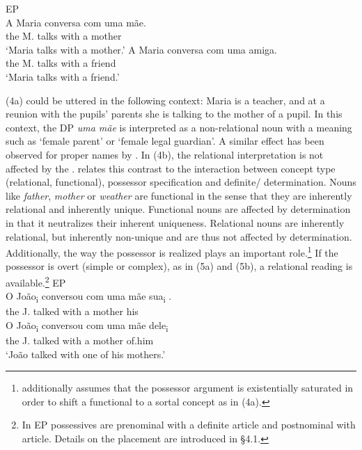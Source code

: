 \documentclass[output=paper]{langsci/langscibook}
\begin{document}
\ea%
    EP\label{ex:wein:4}\\
    \ea 
    \gll A Maria conversa com uma mãe.\\
         the M. talks with a mother\\
    \glt ‘Maria talks with a mother.’
    \ex  
    \gll A Maria conversa com uma amiga.\\
         the M. talks with a friend\\
    \glt ‘Maria talks with a friend.’
    \z
\z

(4a) could be uttered in the following context: Maria is a teacher, and at a reunion with the pupils’ parents she is talking to the mother of a pupil. In this context, the DP \textit{uma mãe} is interpreted as a non-relational noun with a meaning such as ‘female parent’ or ‘female legal guardian’. A similar effect has been observed for proper names by \citet{Longobardi1994}. In (4b), the relational interpretation is not affected by the  . \citet{Löbner2011} relates this contrast to the interaction between concept type (relational, functional), possessor specification and definite\slash {} determination. Nouns like \textit{father}, \textit{mother} or \textit{weather} are functional in the sense that they are inherently relational and inherently unique. Functional nouns are affected by  determination in that it neutralizes their inherent uniqueness. Relational nouns are inherently relational, but inherently non-unique and are thus not affected by  determination. Additionally, the way the possessor is realized plays an important role.\footnote{\citet{Löbner2011} additionally assumes that the possessor argument is existentially saturated in order to shift a functional to a sortal concept as in (4a).} If the possessor is overt (simple or complex), as in (5a) and (5b), a relational reading is available.\footnote{In EP possessives are prenominal with a definite article and postnominal with  article. Details on the placement are introduced in §4.1.}
\pagebreak
\ea%
    EP\label{ex:wein:5}\\
    \ea
    \gll O João\textsubscript{i} conversou com uma mãe sua\textsubscript{i} .  \\
         the J.   talked   with a mother his\\
    \ex  
    \gll O João\textsubscript{i} conversou com uma mãe dele\textsubscript{i} \\
         the J. talked    with a mother of.him \\
    \glt ‘João talked with one of his mothers.’ 
    \z
\z
\end{document}
